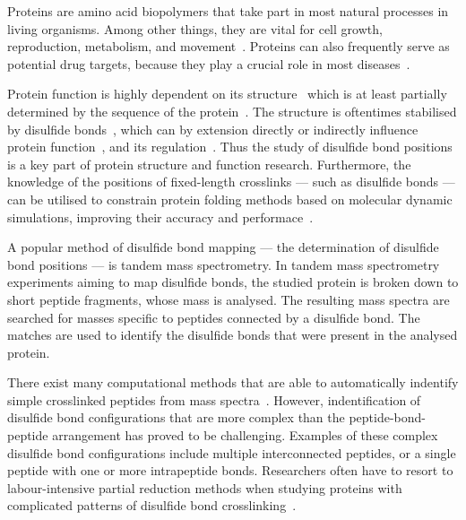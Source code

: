 

Proteins are amino acid biopolymers that take part in most natural processes in living organisms. Among other things, they are vital for cell growth, reproduction, metabolism, and movement~\cite{johnson1994sequential, prescott1968regulation, ketelaar2004actin, elston1998energy}. Proteins can also frequently serve as potential drug targets, because they play a crucial role in most diseases~\cite{konopatskaya2010protein, yamin2008amyloid}.

Protein function is highly dependent on its structure~\cite{orengo1999protein} which is at least partially determined by the sequence of the protein~\cite{anfinsen1973principles}. The structure is oftentimes stabilised by disulfide bonds~\cite{wedemeyer2000disulfide, mcauley2008contributions}, which can by extension directly or indirectly influence protein function~\cite{nagahara2011intermolecular}, and its regulation~\cite{chiu2019allosteric}. Thus the study of disulfide bond positions is a key part of protein structure and function research. Furthermore, the knowledge of the positions of fixed-length crosslinks --- such as disulfide bonds --- can be utilised to constrain protein folding methods based on molecular dynamic simulations, improving their accuracy and performace~\cite{brodie2017solving}.

A popular method of disulfide bond mapping --- the determination of disulfide bond positions --- is tandem mass spectrometry. In tandem mass spectrometry experiments aiming to map disulfide bonds, the studied protein is broken down to short peptide fragments, whose mass is analysed. The resulting mass spectra are searched for masses specific to peptides connected by a disulfide bond. The matches are used to identify the disulfide bonds that were present in the analysed protein.

There exist many computational methods that are able to automatically indentify simple crosslinked peptides from mass spectra~\cite{lakbub2018recent, liu2014facilitating}. However, indentification of disulfide bond configurations that are more complex than the peptide-bond-peptide arrangement has proved to be challenging. Examples of these complex disulfide bond configurations include multiple interconnected peptides, or a single peptide with one or more intrapeptide bonds. Researchers often have to resort to labour-intensive partial reduction methods when studying proteins with complicated patterns of disulfide bond crosslinking~\cite{wu1997novel, li2013disulfide}.

